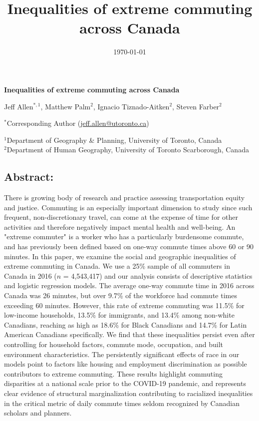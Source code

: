 \documentclass[10 pt,letterpaper]{article}
\title{
	Inequalities of extreme commuting across Canada
}
\date{
	\today}
\begin{document}
\LARGE
\textsf{\textbf{Inequalities of extreme commuting across Canada}}

\vspace{4mm}


	\large
	
	Jeff Allen$^{*,1}$, Matthew Palm$^{2}$, Ignacio Tiznado-Aitken$^{2}$, Steven Farber$^{2}$

	\normalsize
	
	$^{*}$Corresponding Author (\url{jeff.allen@utoronto.ca})
	
	
	$^{1}$Department of Geography \& Planning, 
	University of Toronto, Canada
	\\
	$^{2}$Department of Human Geography, University of Toronto Scarborough, Canada
	
	
	
	
	
	\subsection*{{Abstract:}}
	
	\vspace{-5mm}
	
	There is growing body of research and practice assessing transportation equity and justice. Commuting is an especially important dimension to study since such frequent, non-discretionary travel, can come at the expense of time for other activities and therefore negatively impact mental health and well-being. An "extreme commuter" is a worker who has a particularly burdensome commute, and has previously been defined based on one-way commute times above 60 or 90 minutes. In this paper, we examine the social and geographic inequalities of extreme commuting in Canada. We use a 25\% sample of all commuters in Canada in 2016 ($n$ = 4,543,417) and our analysis consists of descriptive statistics and logistic regression models. The average one-way commute time in 2016 across Canada was 26 minutes, but over 9.7\% of the workforce had commute times exceeding 60 minutes. However, this rate of extreme commuting was 11.5\% for low-income households, 13.5\% for immigrants, and 13.4\% among non-white Canadians, reaching as high as 18.6\% for Black Canadians and 14.7\% for Latin American Canadians specifically. We find that these inequalities persist even after controlling for household factors, commute mode, occupation, and built environment characteristics. The persistently significant effects of race in our models point to factors like housing and employment discrimination as possible contributors to extreme commuting. These results highlight commuting disparities at a national scale prior to the COVID-19 pandemic, and represents clear evidence of structural marginalization contributing to racialized inequalities in the critical metric of daily commute times seldom recognized by Canadian scholars and planners.
	
\end{document}

